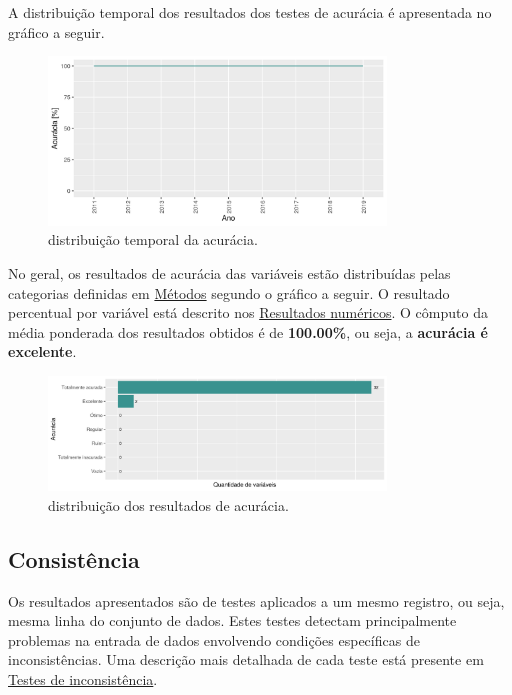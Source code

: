 \documentclass[
  12,
]{proadi}
\begin{document}
A distribuição temporal dos resultados dos testes de acurácia é
apresentada no gráfico a seguir.

\begin{figure}
\centering
\includegraphics[width=0.8\textwidth,height=\textheight]{imagens/ac-anual.png}
\caption{distribuição temporal da acurácia.}
\end{figure}

No geral, os resultados de acurácia das variáveis estão distribuídas
pelas categorias definidas em \protect\hyperlink{muxe9todos}{Métodos}
segundo o gráfico a seguir. O resultado percentual por variável está
descrito nos \protect\hyperlink{resultados-numuxe9ricos}{Resultados
numéricos}. O cômputo da média ponderada dos resultados obtidos é de
\textbf{100.00\%}, ou seja, a \textbf{acurácia é excelente}.

\begin{figure}
\centering
\includegraphics[width=0.8\textwidth,height=\textheight]{imagens/ac.png}
\caption{distribuição dos resultados de acurácia.}
\end{figure}

\hypertarget{consistuxeancia}{%
\subsection{Consistência}\label{consistuxeancia}}

Os resultados apresentados são de testes aplicados a um mesmo registro,
ou seja, mesma linha do conjunto de dados. Estes testes detectam
principalmente problemas na entrada de dados envolvendo condições
específicas de inconsistências. Uma descrição mais detalhada de cada
teste está presente em
\protect\hyperlink{testes-de-inconsistuxeancia}{Testes de
inconsistência}.
\end{document}
